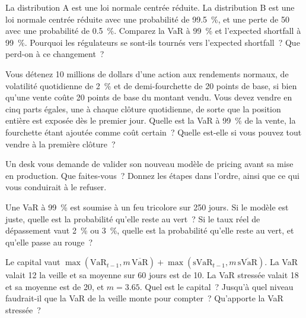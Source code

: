 \begin{question}\label{iq:iv2:risk-validation-and-regulation:21}
La distribution A est une loi normale centrée réduite. La distribution B est une loi normale centrée réduite avec une probabilité de 99.5~\%, et une perte de 50 avec une probabilité de 0.5~\%. Comparez la VaR à 99~\% et l'expected shortfall à 99~\%. Pourquoi les régulateurs se sont-ils tournés vers l'expected shortfall~? Que perd-on à ce changement~?
\end{question}

\begin{question}\label{iq:iv2:risk-validation-and-regulation:22}
Vous détenez 10 millions de dollars d'une action aux rendements normaux, de volatilité quotidienne de 2~\% et de demi-fourchette de 20 points de base, si bien qu'une vente coûte 20 points de base du montant vendu. Vous devez vendre en cinq parts égales, une à chaque clôture quotidienne, de sorte que la position entière est exposée dès le premier jour. Quelle est la VaR à 99~\% de la vente, la fourchette étant ajoutée comme coût certain~? Quelle est-elle si vous pouvez tout vendre à la première clôture~?
\end{question}

\begin{question}\label{iq:iv2:risk-validation-and-regulation:23}
Un desk vous demande de valider son nouveau modèle de pricing avant sa mise en production. Que faites-vous~? Donnez les étapes dans l'ordre, ainsi que ce qui vous conduirait à le refuser.
\end{question}

\begin{question}\label{iq:iv2:risk-validation-and-regulation:24}
Une VaR à 99~\% est soumise à un feu tricolore sur 250 jours. Si le modèle est juste, quelle est la probabilité qu'elle reste au vert~? Si le taux réel de dépassement vaut 2~\% ou 3~\%, quelle est la probabilité qu'elle reste au vert, et qu'elle passe au rouge~?
\end{question}

\begin{question}\label{iq:iv2:risk-validation-and-regulation:25}
Le capital vaut $\max(\mathrm{VaR}_{t-1}, m\,\overline{\mathrm{VaR}}) + \max(\mathrm{sVaR}_{t-1}, m\,\overline{\mathrm{sVaR}})$. La VaR valait 12 la veille et sa moyenne sur 60 jours est de 10. La VaR stressée valait 18 et sa moyenne est de 20, et $m = 3.65$. Quel est le capital~? Jusqu'à quel niveau faudrait-il que la VaR de la veille monte pour compter~? Qu'apporte la VaR stressée~?
\end{question}


